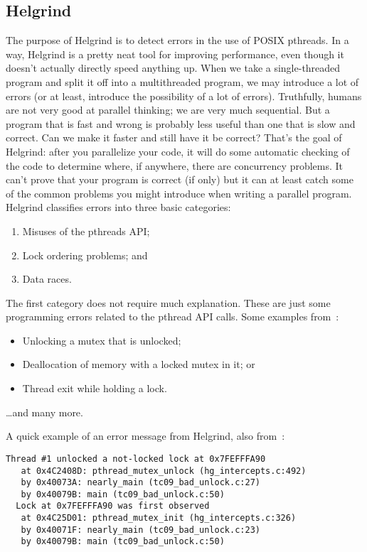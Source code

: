 \subsection*{Helgrind}  
The purpose of Helgrind is to detect errors in the use of POSIX pthreads. In a way, Helgrind is a pretty neat tool for improving performance, even though it doesn't actually directly speed anything up. When we take a single-threaded program and split it off into a multithreaded program, we may introduce a lot of errors (or at least, introduce the possibility of a lot of errors). Truthfully, humans are not very good at parallel thinking; we are very much sequential. But a program that is fast and wrong is probably less useful than one that is slow and correct. Can we make it faster and still have it be correct? That's the goal of Helgrind: after you parallelize your code, it will do some automatic checking of the code to determine where, if anywhere, there are concurrency problems. It can't prove that your program is correct (if only) but it can at least catch some of the common problems you might introduce when writing a parallel program. Helgrind classifies errors into three basic categories:

\begin{enumerate}[noitemsep]
	\item Misuses of the pthreads API;
	\item Lock ordering problems; and
	\item Data races.
\end{enumerate}

The first category does not require much explanation. These are just some programming errors related to the pthread API calls. Some examples from~\cite{helgrind}:

\begin{itemize}[noitemsep]
	\item Unlocking a mutex that is unlocked;
	\item Deallocation of memory with a locked mutex in it; or
	\item Thread exit while holding a lock.
\end{itemize}
\ldots and many more.

A quick example of an error message from Helgrind, also from~\cite{helgrind}:

\begin{lstlisting}
Thread #1 unlocked a not-locked lock at 0x7FEFFFA90
   at 0x4C2408D: pthread_mutex_unlock (hg_intercepts.c:492)
   by 0x40073A: nearly_main (tc09_bad_unlock.c:27)
   by 0x40079B: main (tc09_bad_unlock.c:50)
  Lock at 0x7FEFFFA90 was first observed
   at 0x4C25D01: pthread_mutex_init (hg_intercepts.c:326)
   by 0x40071F: nearly_main (tc09_bad_unlock.c:23)
   by 0x40079B: main (tc09_bad_unlock.c:50)
\end{lstlisting}




